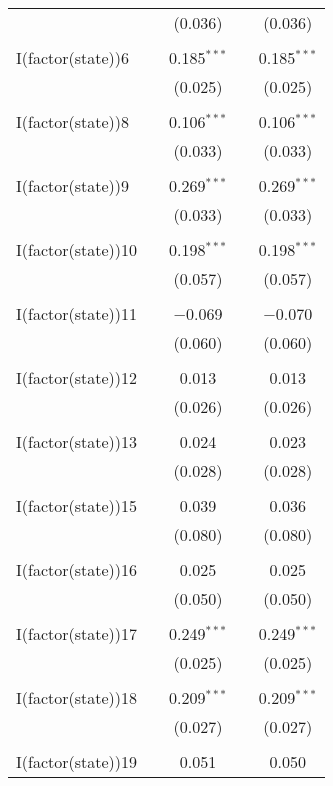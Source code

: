 \begin{table}[!htbp]
\begin{tabular}{@{\extracolsep{5pt}}lcccc}
  &  & (0.036) &  & (0.036) \\ 
  & & & & \\ 
 I(factor(state))6 &  & 0.185$^{***}$ &  & 0.185$^{***}$ \\ 
  &  & (0.025) &  & (0.025) \\ 
  & & & & \\ 
 I(factor(state))8 &  & 0.106$^{***}$ &  & 0.106$^{***}$ \\ 
  &  & (0.033) &  & (0.033) \\ 
  & & & & \\ 
 I(factor(state))9 &  & 0.269$^{***}$ &  & 0.269$^{***}$ \\ 
  &  & (0.033) &  & (0.033) \\ 
  & & & & \\ 
 I(factor(state))10 &  & 0.198$^{***}$ &  & 0.198$^{***}$ \\ 
  &  & (0.057) &  & (0.057) \\ 
  & & & & \\ 
 I(factor(state))11 &  & $-$0.069 &  & $-$0.070 \\ 
  &  & (0.060) &  & (0.060) \\ 
  & & & & \\ 
 I(factor(state))12 &  & 0.013 &  & 0.013 \\ 
  &  & (0.026) &  & (0.026) \\ 
  & & & & \\ 
 I(factor(state))13 &  & 0.024 &  & 0.023 \\ 
  &  & (0.028) &  & (0.028) \\ 
  & & & & \\ 
 I(factor(state))15 &  & 0.039 &  & 0.036 \\ 
  &  & (0.080) &  & (0.080) \\ 
  & & & & \\ 
 I(factor(state))16 &  & 0.025 &  & 0.025 \\ 
  &  & (0.050) &  & (0.050) \\ 
  & & & & \\ 
 I(factor(state))17 &  & 0.249$^{***}$ &  & 0.249$^{***}$ \\ 
  &  & (0.025) &  & (0.025) \\ 
  & & & & \\ 
 I(factor(state))18 &  & 0.209$^{***}$ &  & 0.209$^{***}$ \\ 
  &  & (0.027) &  & (0.027) \\ 
  & & & & \\ 
 I(factor(state))19 &  & 0.051 &  & 0.050 \\ 

\end{tabular}
\end{table}

